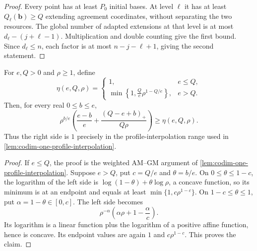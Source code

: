 \documentclass[11pt,a4paper]{amsart}
\numberwithin{equation}{section}
\theoremstyle{remark}
\begin{document}
\begin{proof}
Every point has at least $P_0$ initial bases.  At level $\ell$ it has at
least $Q_\ell(\mathbf b)\ge Q$ extending agreement coordinates, without
separating the two resources.  The global number of adapted extensions at
that level is at most $d_\ell-(j+\ell-1)$.  Multiplication and double
counting give the first bound.  Since $d_\ell\le n$, each factor is at most
$n-j-\ell+1$, giving the second statement.
\end{proof}

\begin{lemma}
\label{lem:flag-interpolation-defect}
For $e,Q>0$ and $\rho\ge1$, define
\begin{equation}
 \eta(e,Q,\rho)=
 \begin{cases}
 1,&e\le Q,\\
 \displaystyle
 \min\left\{1,\frac Qe\rho^{1-Q/e}\right\},&e>Q.
 \end{cases}
 \label{eq:flag-eta}
\end{equation}
Then, for every real $0\le b\le e$,
\begin{equation}
 \rho^{b/e}
 \left(
  \frac{e-b}{e}
  +\frac{(Q-e+b)_+}{Q\rho}
 \right)
 \ge\eta(e,Q,\rho).
 \label{eq:flag-one-level-interpolation}
\end{equation}
Thus the right side is $1$ precisely in the profile-interpolation range
used in \cref{lem:codim-one-profile-interpolation}.
\end{lemma}

\begin{proof}
If $e\le Q$, the proof is the weighted AM--GM argument of
\cref{lem:codim-one-profile-interpolation}.  Suppose $e>Q$, put
$c=Q/e$ and $\theta=b/e$.  On $0\le\theta\le1-c$, the logarithm of the
left side is
$\log(1-\theta)+\theta\log\rho$, a concave function, so its minimum is
at an endpoint and equals at least
$\min\{1,c\rho^{1-c}\}$.  On $1-c\le\theta\le1$, put
$\alpha=1-\theta\in[0,c]$.  The left side becomes
\[
 \rho^{-\alpha}\left(\alpha\rho+1-\frac\alpha c\right).
\]
Its logarithm is a linear function plus the logarithm of a positive
affine function, hence is concave.  Its endpoint values are again
$1$ and $c\rho^{1-c}$.  This proves the claim.
\end{proof}
\end{document}
